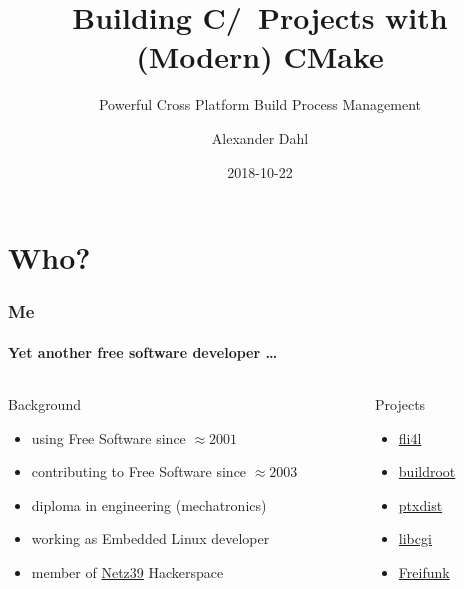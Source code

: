 \documentclass[t]{beamer}
\title[CMake]{Building C/\CPP\ Projects with (Modern) CMake}
\subtitle{Powerful Cross Platform Build Process Management}
\author{Alexander Dahl}
\institute[lespocky.de]{\url{http://www.lespocky.de/}}
\date{2018-10-22}
\begin{document}
\begin{frame}
    \titlepage
\end{frame}



\section*{Who?}

\begin{frame}
    \frametitle{Me}
    \framesubtitle{Yet another free software developer \dots}

    \begin{columns}[T]
        \begin{column}{0.7\textwidth}
            \begin{block}{Background}
                \begin{itemize}
                    \item using Free Software since $\approx 2001$
                    \item contributing to Free Software since $\approx 2003$
                    \item diploma in engineering (mechatronics)
                    \item working as Embedded Linux developer
                    \item member of \href{http://www.netz39.de/}{Netz39}
                        Hackerspace
                \end{itemize}
            \end{block}
        \end{column}
        \pause
        \begin{column}{0.3\textwidth}
            \begin{block}{Projects}
                \begin{itemize}
                    \item \href{https://www.fli4l.de/}{fli4l}
                    \item \href{https://buildroot.org/}{buildroot}
                    \item \href{https://ptxdist.org/}{ptxdist}
                    \item \href{https://github.com/rafaelsteil/libcgi}{libcgi}
                    \item \href{https://freifunk.net/}{Freifunk}
                \end{itemize}
            \end{block}
        \end{column}
    \end{columns}
\end{frame}
\end{document}
